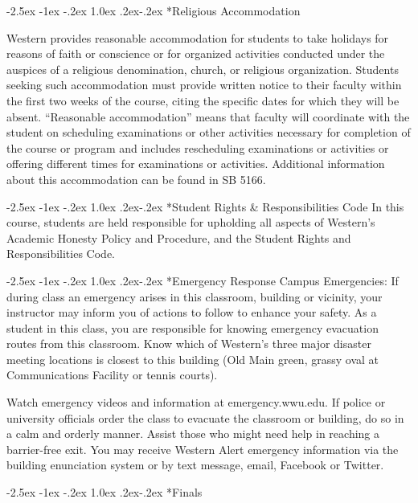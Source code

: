 \documentclass[letterpaper,12pt]{article}
\makeatletter
\renewcommand\section{%
  \@startsection {section}{1}{\z@}%
  {-2.5ex \@plus -1ex \@minus -.2ex}%
  {1.0ex \@plus.2ex\@minus-.2ex}%
  {\normalfont\Large\bfseries}}
\makeatother
\begin{document}
\section*{Religious Accommodation}

Western provides reasonable accommodation for students to take holidays for
reasons of faith or conscience or for organized activities conducted under the
auspices of a religious denomination, church, or religious
organization. Students seeking such accommodation must provide written notice to
their faculty within the first two weeks of the course, citing the specific
dates for which they will be absent.  ``Reasonable accommodation'' means that
faculty will coordinate with the student on scheduling examinations or other
activities necessary for completion of the course or program and includes
rescheduling examinations or activities or offering different times for
examinations or activities.  Additional information about this accommodation can
be found in SB 5166.

\section*{Student Rights \& Responsibilities Code}
In this course, students are held responsible for upholding all aspects of
Western's Academic Honesty Policy and Procedure, and the Student Rights and
Responsibilities Code.

\section*{Emergency Response}
Campus Emergencies: If during class an emergency arises in this classroom,
building or vicinity, your instructor may inform you of actions to follow to
enhance your safety. As a student in this class, you are responsible for knowing
emergency evacuation routes from this classroom. Know which of Western’s three
major disaster meeting locations is closest to this building (Old Main green,
grassy oval at Communications Facility or tennis courts).

Watch emergency videos and information at emergency.wwu.edu. If police or
university officials order the class to evacuate the classroom or building, do
so in a calm and orderly manner. Assist those who might need help in reaching a
barrier-free exit. You may receive Western Alert emergency information via the
building enunciation system or by text message, email, Facebook or Twitter.

\section*{Finals}
\end{document}
